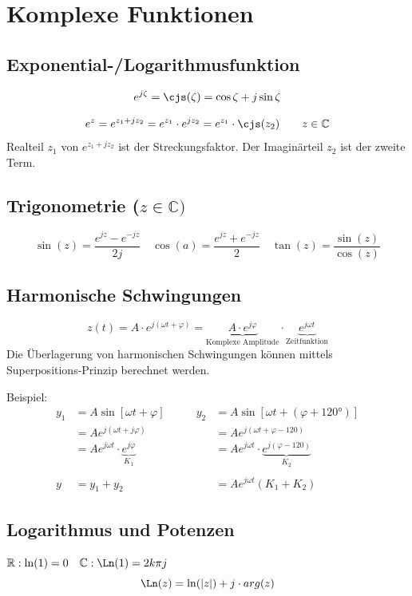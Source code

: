 \section{Komplexe Funktionen}
\subsection{Exponential-/Logarithmusfunktion}
\[e^{j\zeta}= \cjs(\zeta) = \cos\zeta + j\sin\zeta\]

\[e^z= e^{z_1 + jz_2} = e^{z_1}\cdot e^{jz_2} = e^{z_1} \cdot \cjs(z_2) \qquad z \in \mathbb{C} \]
Realteil $z_1$ von $e^{z_1+jz_2}$ ist der Streckungsfaktor. Der Imaginärteil $z_2$ ist der zweite Term.

\subsection{Trigonometrie ($z \in \mathbb{C})$}
\[\sin(z) = \frac{e^{jz} -e^{-jz}}{2j} \quad \cos(a) = \frac{e^{jz} +e^{-jz}}{2} \quad \tan(z) = \frac{\sin(z)}{\cos(z)}\]

\subsection{Harmonische Schwingungen}
\[
z(t) = A \cdot e^{j(\omega t + \varphi)} = \underbrace{A \cdot e^{j\varphi}}_\text{Komplexe Amplitude} \cdot \underbrace{e^{j\omega t}}_{\text{Zeitfunktion}}
\]
\noindent Die Überlagerung von harmonischen Schwingungen können mittels Superpositions-Prinzip berechnet werden.

\noindent Beispiel:
\begin{align*}
	y_1 &= A\sin[\omega t + \varphi] &\qquad y_2 &= A\sin[\omega t + (\varphi + 120°)] \\
	    &= A e ^{j(\omega t + j\varphi)} &\qquad  &= A e^{j(\omega t + \varphi - 120)}\\
 	    &= A e ^{j\omega t} \cdot \underbrace{e^{j\varphi}}_{K_1} &\qquad  &= A e^{j\omega t} \cdot \underbrace{e^{j(\varphi - 120)}}_{K_2}\\    
  	\\
  y &= y_1 + y_2 &&= A e^{j\omega t} (K_1 + K_2) 
\end{align*}

\subsection{Logarithmus und Potenzen}
$\mathbb{R}: \ln(1) = 0 \quad \mathbb{C}: \Ln(1)= 2k\pi j$
\[\Ln(z) = \ln(\left|z\right|) + j\cdot arg(z) \]

